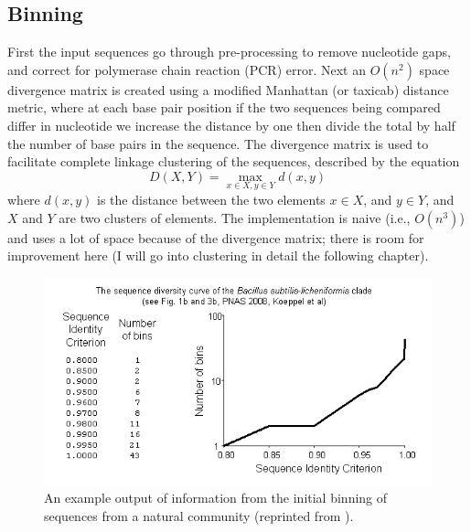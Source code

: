 \subsection*{Binning}
First the input sequences go through pre-processing to remove nucleotide gaps, and correct for polymerase chain reaction (PCR) error.
Next an $O(n^2)$ space divergence matrix is created using a modified Manhattan (or taxicab) distance metric, where at each base pair position if the two sequences being compared differ in nucleotide we increase the distance by one then divide the total by half the number of base pairs in the sequence.
The divergence matrix is used to facilitate complete linkage clustering of the sequences, described by the equation $$D(X,Y)= \max_{x\in X, y\in Y} d(x,y)$$ where $d(x,y)$ is the distance between the two elements $x \in X$, and $y \in Y$, and $X$ and $Y$ are two clusters of elements.
The implementation is naive (i.e., $O(n^3)$) and uses a lot of space because of the divergence matrix; there is room for improvement here (I will go into clustering in detail the following chapter). 

\begin{figure}[h!]
 \centering
 \label{fig:Binning}
 \includegraphics[scale=1.75]{images/Binning-CH2}
 \caption[Sequence identity graph and example output produced by binning.]{An example output of information from the initial binning of sequences from a natural community (reprinted from \protect\cite{koeppel2008identifying}). }
  \label{fig:Binning}
\end{figure}

